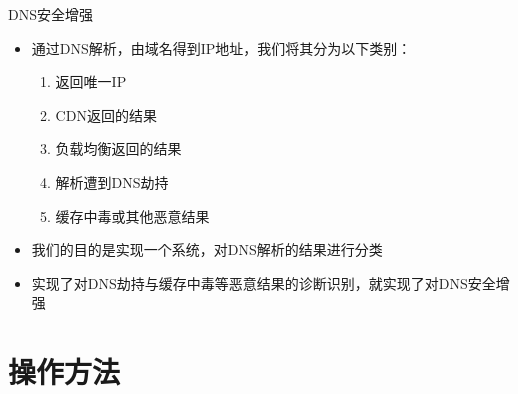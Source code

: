 \documentclass{beamer}
\begin{document}
\begin{frame}{DNS安全增强}

  \begin{itemize}
    \item 通过DNS解析，由域名得到IP地址，我们将其分为以下类别：
  \begin{enumerate}
    \item 返回唯一IP
    \item CDN返回的结果
    \item 负载均衡返回的结果
    \item 解析遭到DNS劫持
    \item 缓存中毒或其他恶意结果
  \end{enumerate}
  \item 我们的目的是实现一个系统，对DNS解析的结果进行分类
  \item 实现了对DNS劫持与缓存中毒等恶意结果的诊断识别，就实现了对DNS安全增强
  \end{itemize}
  
\end{frame}

\section{操作方法}
\end{document}
